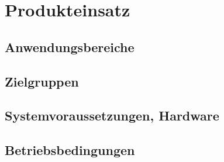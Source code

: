 \section{Produkteinsatz}


\subsection{Anwendungsbereiche}


\subsection{Zielgruppen}


\subsection{Systemvoraussetzungen, Hardware}


\subsection{Betriebsbedingungen}


